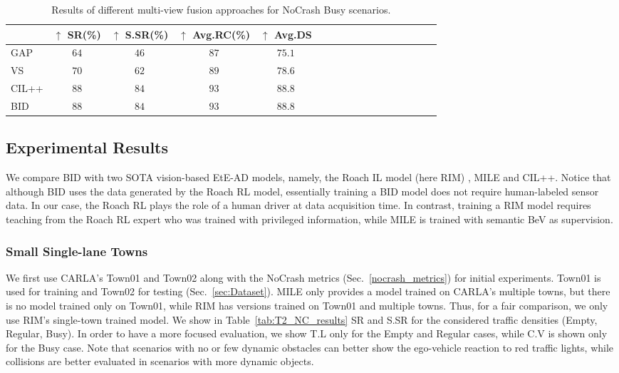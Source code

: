 \begin{table}
	\centering
	\begin{tabular}{@{}lcccccccccccccccc@{}}
		\toprule
		& $\uparrow$ SR(\%) & $\uparrow$ S.SR(\%) & $\uparrow$ Avg.RC(\%) & $\uparrow$ Avg.DS  \\
		\midrule
		GAP & $64$ & $46$ & $87$ & $75.1$  \\
		VS & $70$ & $62$ & $89$ & $78.6$  \\
		CIL++ & $88$ & $84$ & $93$ & $88.8$  \\
		BID & $88$ & $84$ & $93$ & $88.8$  \\ 
		\bottomrule
	\end{tabular}
	\caption{Results of different multi-view fusion approaches for NoCrash Busy scenarios.}
	\label{tab:ablation_study_sa}
\end{table}


\subsection{Experimental Results}
\label{sec:Results}
We compare BID with two SOTA vision-based EtE-AD models, namely, the Roach IL model (here RIM) \cite{Zhang:2021}, MILE \cite{Hu:2022} and CIL++. 
Notice that although BID uses the data generated by the Roach RL model, essentially training a BID model does not require human-labeled sensor data. 
In our case, the Roach RL plays the role of a human driver at data acquisition time. 
In contrast, training a RIM model requires teaching from the Roach RL expert who was trained with privileged information, while MILE is trained with semantic BeV as supervision.


\subsubsection{Small Single-lane Towns} \label{sec:small_town_results}
We first use CARLA's Town01 and Town02 along with the NoCrash metrics (Sec.~\ref{nocrash_metrics}) for initial experiments. 
Town01 is used for training and Town02 for testing (Sec.~\ref{sec:Dataset}). 
MILE only provides a model trained on CARLA's multiple towns, but there is no model trained only on Town01, while RIM has versions trained on Town01 and multiple towns. 
Thus, for a fair comparison, we only use RIM's single-town trained model. 
We show in Table~\ref{tab:T2_NC_results} SR and S.SR for the considered traffic densities (Empty, Regular, Busy). 
In order to have a more focused evaluation, we show T.L only for the Empty and Regular cases, while C.V is shown only for the Busy case. 
Note that scenarios with no or few dynamic obstacles can better show the ego-vehicle reaction to red traffic lights, while collisions are better evaluated in scenarios with more dynamic objects. 


